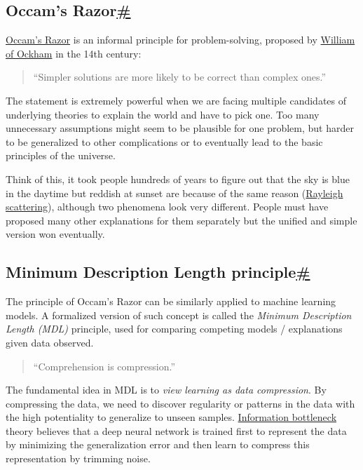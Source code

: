 \subsection{\texorpdfstring{Occam's Razor\hyperref[occams-razor]{\#}}{Occam's Razor\#}}\label{occams-razor}

\href{http://pespmc1.vub.ac.be/OCCAMRAZ.html}{Occam's Razor} is an informal principle for problem-solving, proposed by \href{https://en.wikipedia.org/wiki/William_of_Ockham}{William of Ockham} in the 14th century:

\begin{quote}
``Simpler solutions are more likely to be correct than complex ones.''
\end{quote}

The statement is extremely powerful when we are facing multiple candidates of underlying theories to explain the world and have to pick one. Too many unnecessary assumptions might seem to be plausible for one problem, but harder to be generalized to other complications or to eventually lead to the basic principles of the universe.

Think of this, it took people hundreds of years to figure out that the sky is blue in the daytime but reddish at sunset are because of the same reason (\href{https://en.wikipedia.org/wiki/Rayleigh_scattering}{Rayleigh scattering}), although two phenomena look very different. People must have proposed many other explanations for them separately but the unified and simple version won eventually.

\subsection{\texorpdfstring{Minimum Description Length principle\hyperref[minimum-description-length-principle]{\#}}{Minimum Description Length principle\#}}\label{minimum-description-length-principle}

The principle of Occam's Razor can be similarly applied to machine learning models. A formalized version of such concept is called the \emph{Minimum Description Length (MDL)} principle, used for comparing competing models / explanations given data observed.

\begin{quote}
``Comprehension is compression.''
\end{quote}

The fundamental idea in MDL is to \emph{view learning as data compression}. By compressing the data, we need to discover regularity or patterns in the data with the high potentiality to generalize to unseen samples. \href{https://lilianweng.github.io/posts/2017-09-28-information-bottleneck/}{Information bottleneck} theory believes that a deep neural network is trained first to represent the data by minimizing the generalization error and then learn to compress this representation by trimming noise.

